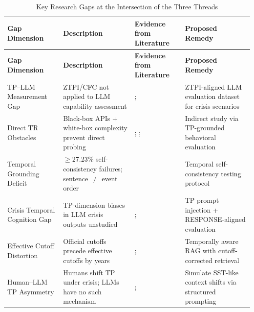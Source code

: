 \documentclass[12pt, a4paper]{article}
\begin{document}
\begin{longtable}{@{}p{3.5cm} p{3.5cm} p{3.5cm} p{4.2cm}@{}}
\caption{Key Research Gaps at the Intersection of the Three Threads}
\label{tab:gaps}\\
\toprule
\textbf{Gap Dimension} & \textbf{Description} &
\textbf{Evidence from Literature} & \textbf{Proposed Remedy} \\
\midrule
\endfirsthead
\toprule
\textbf{Gap Dimension} & \textbf{Description} &
\textbf{Evidence from Literature} & \textbf{Proposed Remedy} \\
\midrule
\endhead
\bottomrule
\endlastfoot

TP--LLM Measurement Gap
  & ZTPI/CFC not applied to LLM capability assessment
  & \textcite{zimbardo1999putting}; \textcite{tram2024}
  & ZTPI-aligned LLM evaluation dataset for crisis scenarios \\[6pt]

Direct TR Obstacles
  & Black-box APIs + white-box complexity prevent direct probing
  & \textcite{ticktoc2025}; \textcite{tdbench2026}; \textcite{song2025temporal}
  & Indirect study via TP-grounded behavioral evaluation \\[6pt]

Temporal Grounding Deficit
  & $\geq$27.23\% self-consistency failures; sentence $\neq$ event order
  & \textcite{qiu2024temporally}
  & Temporal self-consistency testing protocol \\[6pt]

Crisis Temporal Cognition Gap
  & TP-dimension biases in LLM crisis outputs unstudied
  & \textcite{diallo2025response}; \textcite{wei2025time}
  & TP prompt injection + RESPONSE-aligned evaluation \\[6pt]

Effective Cutoff Distortion
  & Official cutoffs precede effective cutoffs by years
  & \textcite{cheng2024dated}; \textcite{zhu2025freshbench}
  & Temporally aware RAG with cutoff-corrected retrieval \\[6pt]

Human--LLM TP Asymmetry
  & Humans shift TP under crisis; LLMs have no such mechanism
  & \textcite{carstensen1999taking}; \textcite{ticktoc2025}
  & Simulate SST-like context shifts via structured prompting \\

\end{longtable}

\printbibliography
\end{document}
